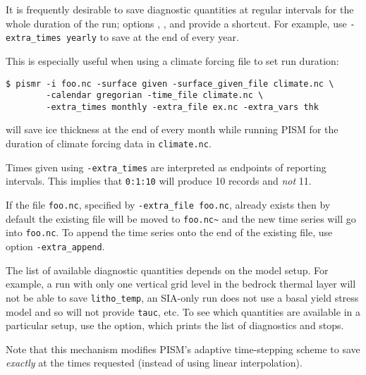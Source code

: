It is frequently desirable to save diagnostic quantities at regular intervals for the whole duration of the run; options , , and  provide a shortcut. For example, use \texttt{-extra_times yearly} to save at the end of every year.

This is especially useful when using a climate forcing file to set run duration:
\begin{verbatim}
$ pismr -i foo.nc -surface given -surface_given_file climate.nc \
        -calendar gregorian -time_file climate.nc \
        -extra_times monthly -extra_file ex.nc -extra_vars thk
\end{verbatim} %
will save ice thickness at the end of every month while running PISM for the duration of climate forcing data in \texttt{climate.nc}.

Times given using \texttt{-extra_times} are interpreted as endpoints of reporting intervals. This implies that \texttt{0:1:10} will produce 10 records and \emph{not} 11.

If the file \texttt{foo.nc}, specified by \texttt{-extra_file foo.nc}, already exists then by default the existing file will be moved to \texttt{foo.nc\~} and the new time series will go into \texttt{foo.nc}.  To append the time series onto the end of the existing file, use option \texttt{-extra_append}.

The list of available diagnostic quantities depends on the model setup. For
example, a run with only one vertical grid level in the bedrock thermal layer
will not be able to save \texttt{litho_temp}, an SIA-only run does not use a
basal yield stress model and so will not provide \texttt{tauc}, etc. To see
which quantities are available in a particular setup, use the
\intextoption{list_diagnostics} option, which prints the list of diagnostics
and stops.

Note that this mechanism modifies PISM's adaptive time-stepping scheme to save
\emph{exactly} at the times requested (instead of using linear interpolation).

